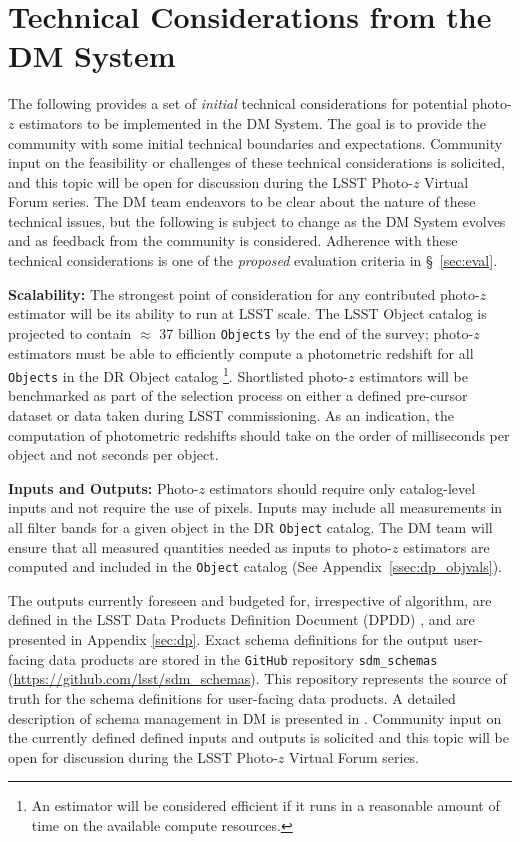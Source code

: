 \documentclass[DM,authoryear,toc]{lsstdoc}
\begin{document}
\section{Technical Considerations from the DM System}\label{sec:dmcon}

The following provides a set of {\it initial} technical considerations for potential photo-$z$ estimators to be implemented in the DM System.
The goal is to provide the community with some initial technical boundaries and expectations. 
Community input on the feasibility or challenges of these technical considerations is solicited, and this topic will be open for discussion during the LSST Photo-$z$ Virtual Forum series.
The DM team endeavors to be clear about the nature of these technical issues, but the following is subject to change as the DM System evolves and as feedback from the community is considered. 
Adherence with these technical considerations is one of the {\it proposed} evaluation criteria in \S~\ref{sec:eval}.

\textbf{Scalability:}
The strongest point of consideration for any contributed  photo-$z$ estimator will be its ability to run at LSST scale. 
The LSST Object catalog is projected to contain $\approx$ 37 billion {\tt Objects} by the end of the survey;  photo-$z$ estimators must be able to efficiently compute a photometric redshift for all {\tt Objects} in the DR Object catalog \footnote{An estimator will be considered efficient if it runs in a reasonable amount of time on the available compute resources.}. 
Shortlisted photo-$z$ estimators will be benchmarked as part of the selection process on either a defined pre-cursor dataset or data taken during LSST commissioning.
As an indication, the computation of photometric redshifts should take on the order of milliseconds per object and not seconds per object.

\textbf{Inputs and Outputs:}
Photo-$z$ estimators should require only catalog-level inputs and not require the use of pixels. 
Inputs may include all measurements in all filter bands for a given object in the DR {\tt Object} catalog. 
The DM team will ensure that all measured quantities needed as inputs to photo-$z$ estimators are computed and included in the {\tt Object} catalog (See Appendix~\ref{ssec:dp_objvals}). 

The outputs currently foreseen and budgeted for, irrespective of algorithm, are defined in the LSST Data Products Definition Document (DPDD) \cite{LSE-163}, and are presented in Appendix \ref{sec:dp}. 
Exact schema definitions for the output user-facing data products are stored in the {\tt GitHub} repository {\tt sdm\_schemas} (\url{https://github.com/lsst/sdm\_schemas}). 
This repository represents the source of truth for the schema definitions for user-facing data products.
A detailed description of schema management in DM is presented in \cite{dmtn-153}. 
Community input on the currently defined defined inputs and outputs is solicited and this topic will be open for discussion during the LSST Photo-$z$ Virtual Forum series. 
\end{document}
